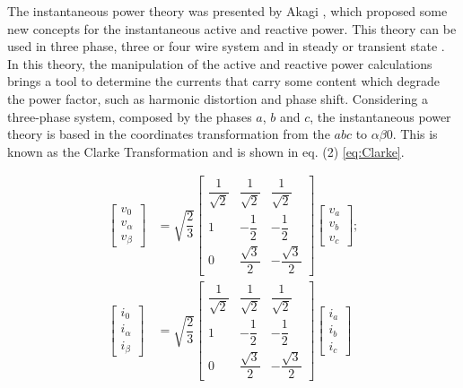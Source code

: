 The instantaneous power theory was presented by Akagi \cite{Akagi}, which proposed some new concepts for the instantaneous active and reactive power. This theory can be used in three phase, three or four wire system and in steady or transient state \cite{Akagi,Akagi}. In this theory, the manipulation of the active and reactive power calculations brings a tool to determine the currents that carry some content which degrade the power factor, such as harmonic distortion and phase shift.
Considering a three-phase system, composed by the phases $a$, $b$ and $c$, the instantaneous power theory is based in the coordinates transformation from the $abc$ to $\alpha \beta 0 $. This is known as the Clarke Transformation and is shown in eq. (2) \ref{eq:Clarke}.

\begin{equation}
\begin{aligned}
\begin{bmatrix}
v_0\\
v_\alpha\\
v_\beta
\end{bmatrix}
& = \sqrt{\dfrac{2}{3}}
\begin{bmatrix}
\dfrac{1}{\sqrt{2}}	& \dfrac{1}{\sqrt{2}}	& \dfrac{1}{\sqrt{2}}		\\[2ex]
1					& -\dfrac{1}{2}			& -\dfrac{1}{2}				\\[2ex]
0					& \dfrac{\sqrt{3}}{2}	& -\dfrac{\sqrt{3}}{2}
\end{bmatrix}
\begin{bmatrix}
v_a\\
v_b\\
v_c
\end{bmatrix}
;\\
\begin{bmatrix}
i_0\\
i_\alpha\\
i_\beta
\end{bmatrix}
& = \sqrt{\dfrac{2}{3}}
\begin{bmatrix}
\dfrac{1}{\sqrt{2}}	& \dfrac{1}{\sqrt{2}}	& \dfrac{1}{\sqrt{2}}		\\[2ex]
1					& -\dfrac{1}{2}			& -\dfrac{1}{2}				\\[2ex]
0					& \dfrac{\sqrt{3}}{2}	& -\dfrac{\sqrt{3}}{2}
\end{bmatrix}
\begin{bmatrix}
i_a\\
i_b\\
i_c
\end{bmatrix}
\label{eq:Clarke}
\end{aligned}
\end{equation} 

